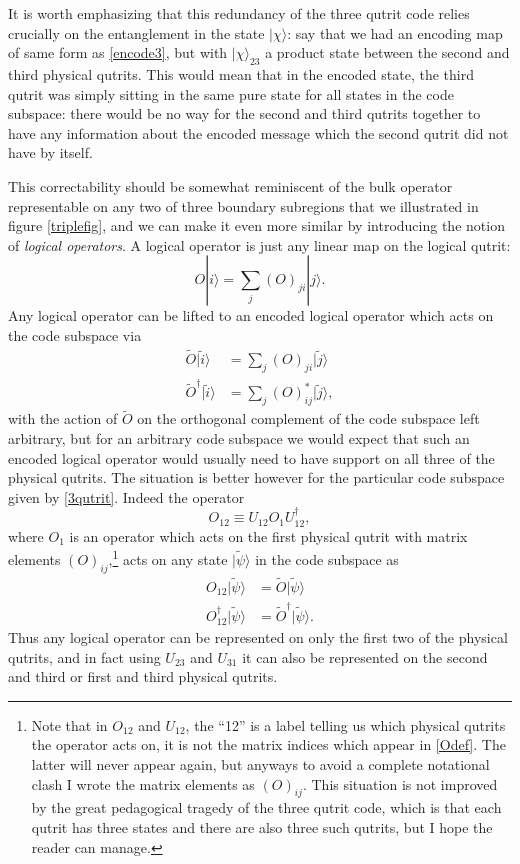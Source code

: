 \documentclass[toc]{PoS}
\newcommand{\be}{\begin{equation}}
\newcommand{\ee}{\end{equation}}
\newcommand{\ran}{\rangle}
\newcommand{\wt}{\widetilde}
\begin{document}
It is worth emphasizing that this redundancy of the three qutrit code relies crucially on the entanglement in the state $|\chi\ran$: say that we had an encoding map of same form as \eqref{encode3}, but with $|\chi\ran_{23}$ a product state between the second and third physical qutrits.  This would mean that in the encoded state, the third qutrit was simply sitting in the same pure state for all states in the code subspace: there would be no way for the second and third qutrits together to have any information about the encoded message which the second qutrit did not have by itself.  

This correctability should be somewhat reminiscent of the bulk operator representable on any two of three boundary subregions that we illustrated in figure \ref{triplefig}, and we can make it even more similar by introducing the notion of \textit{logical operators}.  A logical operator is just any linear map on the logical qutrit:
\be\label{Odef}
O|i\ran=\sum_j(O)_{ji}|j\ran.
\ee
Any logical operator can be lifted to an encoded logical operator which acts on the code subspace via
\begin{align}\nonumber
\wt{O}|\wt{i}\ran&=\sum_j(O)_{ji}|\wt{j}\ran\\
\wt{O}^\dagger|\wt{i}\ran&=\sum_j(O)_{ij}^*|\wt{j}\ran,
\end{align}
with the action of $\wt{O}$ on the orthogonal complement of the code subspace left arbitrary, but for an arbitrary code subspace we would expect that such an encoded logical operator would usually need to have support on all three of the physical qutrits.  The situation is better however for the particular code subspace given by \eqref{3qutrit}.   Indeed the operator
\be\label{O12}
O_{12}\equiv U_{12}O_1 U_{12}^\dagger,
\ee
where $O_1$ is an operator which acts on the first physical qutrit with matrix elements $(O)_{ij}$,\footnote{Note that in $O_{12}$ and $U_{12}$, the ``12'' is a label telling us which physical qutrits the operator acts on, it is not the matrix indices which appear in \eqref{Odef}. The latter will never appear again, but anyways to avoid a complete notational clash I wrote the matrix elements as $(O)_{ij}$.  This situation is not improved by the great pedagogical tragedy of the three qutrit code, which is that each qutrit has three states and there are also three such qutrits, but I hope the reader can manage.} acts on any state $|\wt{\psi}\ran$ in the code subspace as
\begin{align}\nonumber
O_{12}|\wt{\psi}\ran&=\wt{O}|\wt{\psi}\ran\\
O_{12}^\dagger|\wt{\psi}\ran&=\wt{O}^\dagger |\wt{\psi}\ran.
\end{align}
Thus any logical operator can be represented on only the first two of the physical qutrits, and in fact using $U_{23}$ and $U_{31}$ it can also be represented on the second and third or first and third physical qutrits.  
\end{document}
